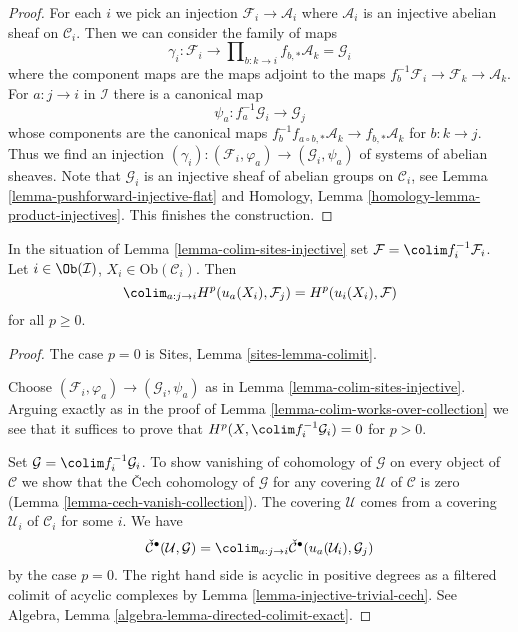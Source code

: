 \begin{proof}
For each $i$ we pick an injection $\mathcal{F}_i \to \mathcal{A}_i$
where $\mathcal{A}_i$ is an injective abelian sheaf on $\mathcal{C}_i$.
Then we can consider the family of maps
$$
\gamma_i :
\mathcal{F}_i
\longrightarrow
\prod\nolimits_{b : k \to i} f_{b, *}\mathcal{A}_k = \mathcal{G}_i
$$
where the component maps are the maps adjoint to the maps
$f_b^{-1}\mathcal{F}_i \to \mathcal{F}_k \to \mathcal{A}_k$.
For $a : j \to i$ in $\mathcal{I}$ there is a canonical map
$$
\psi_a : f_a^{-1}\mathcal{G}_i \to \mathcal{G}_j
$$
whose components are the canonical maps
$f_b^{-1}f_{a \circ b, *}\mathcal{A}_k \to f_{b, *}\mathcal{A}_k$
for $b : k \to j$. Thus we find an injection
$(\gamma_i) : (\mathcal{F}_i, \varphi_a) \to (\mathcal{G}_i, \psi_a)$
of systems of abelian sheaves. Note that $\mathcal{G}_i$ is an injective
sheaf of abelian groups on $\mathcal{C}_i$, see
Lemma \ref{lemma-pushforward-injective-flat} and
Homology, Lemma \ref{homology-lemma-product-injectives}.
This finishes the construction.
\end{proof}

\begin{lemma}
\label{lemma-colimit}
In the situation of Lemma \ref{lemma-colim-sites-injective} set
$\mathcal{F} = \colim f_i^{-1}\mathcal{F}_i$.
Let $i \in \Ob(\mathcal{I})$, $X_i \in \text{Ob}(\mathcal{C}_i)$. Then
$$
\colim_{a : j \to i} H^p(u_a(X_i), \mathcal{F}_j) =
H^p(u_i(X_i), \mathcal{F})
$$
for all $p \geq 0$.
\end{lemma}

\begin{proof}
The case $p = 0$ is Sites, Lemma \ref{sites-lemma-colimit}.

\medskip\noindent
Choose $(\mathcal{F}_i, \varphi_a) \to (\mathcal{G}_i, \psi_a)$
as in Lemma \ref{lemma-colim-sites-injective}.
Arguing exactly as in the proof of
Lemma \ref{lemma-colim-works-over-collection}
we see that it suffices to prove that
$H^p(X, \colim f_i^{-1}\mathcal{G}_i) = 0$ for $p > 0$.

\medskip\noindent
Set $\mathcal{G} = \colim f_i^{-1}\mathcal{G}_i$.
To show vanishing of cohomology of $\mathcal{G}$ on every object
of $\mathcal{C}$ we show that the {\v C}ech cohomology of $\mathcal{G}$
for any covering $\mathcal{U}$ of $\mathcal{C}$ is zero
(Lemma \ref{lemma-cech-vanish-collection}).
The covering $\mathcal{U}$ comes from a covering
$\mathcal{U}_i$ of $\mathcal{C}_i$ for some $i$. We have
$$
\check{\mathcal{C}}^\bullet(\mathcal{U}, \mathcal{G}) =
\colim_{a : j \to i}
\check{\mathcal{C}}^\bullet(u_a(\mathcal{U}_i), \mathcal{G}_j)
$$
by the case $p = 0$. The right hand side is acyclic in positive degrees
as a filtered colimit of acyclic complexes by
Lemma \ref{lemma-injective-trivial-cech}. See
Algebra, Lemma \ref{algebra-lemma-directed-colimit-exact}.
\end{proof}















